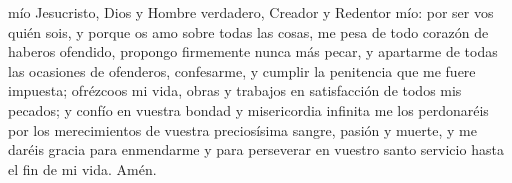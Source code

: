 mío Jesucristo, Dios y Hombre verdadero, Creador y Redentor mío: por ser vos quién sois, y porque os amo sobre todas las cosas,
me pesa de todo corazón de haberos ofendido, propongo firmemente nunca más pecar, y apartarme de todas las ocasiones de ofenderos,
confesarme, y cumplir la penitencia que me fuere impuesta; ofrézcoos mi vida, obras y trabajos en satisfacción de todos mis pecados;
y confío en vuestra bondad y misericordia infinita me los perdonaréis por los merecimientos de vuestra preciosísima sangre, pasión y muerte,
y me daréis gracia para enmendarme y para perseverar en vuestro santo servicio hasta el fin de mi vida. Amén.
